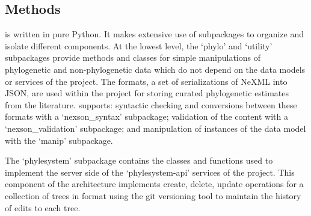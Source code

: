 \begin{methods}
\section{Methods}
\pey is written in pure Python.
It makes extensive use of subpackages to organize and isolate different components.
At the lowest level, the `phylo' and `utility' subpackages provide methods and classes
    for simple manipulations of phylogenetic and non-phylogenetic data which do not
    depend on the data models or services of the \otol project.
The \nexson  formats\citep{NexSON}, a set of serializations of NeXML \citep{NeXML} into JSON, are used
    within the project for storing curated phylogenetic estimates from the literature.
\pey supports: syntactic checking and conversions between these formats with a `nexson\_syntax'
    subpackage;
    validation of the content with a `nexson\_validation' subpackage; and 
    manipulation of instances of the \nexson data model with the `manip' subpackage.

The `phylesystem' subpackage contains the classes and functions used to implement the
    server side of the `phylesystem-api' services of the \otol project.
This component of the architecture \citep[described in more detail in][]{phylesystemapi}
    implements create, delete, update operations for a collection of trees in \nexson
    format using the git versioning tool to maintain the history of edits to each
    tree.


\end{methods}
